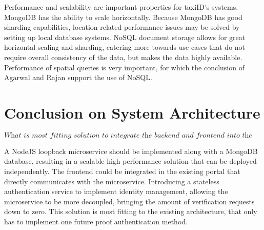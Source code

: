 Performance and scalability are important properties for taxiID's systems. MongoDB has the ability to scale horizontally. Because MongoDB has good sharding capabilities, location related performance issues may be solved by setting up local database systems. NoSQL document storage allows for great horizontal scaling and sharding, catering more towards use cases that do not require overall consistency of the data, but makes the data highly available. Performance of spatial queries is very important, for which the conclusion of Agarwal and Rajan support the use of NoSQL.

%
\section{Conclusion on System Architecture}
\[\textit{What is most fitting solution to integrate the backend and frontend into the existing architecture?}\] \hfill

A NodeJS loopback microservice should be implemented along with a MongoDB database, resulting in a scalable high performance solution that can be deployed independently. The frontend could be integrated in the existing portal that directly communicates with the microservice. Introducing a stateless authentication service to implement identity management, allowing the microservice to be more decoupled, bringing the amount of verification requests down to zero. This solution is most fitting to the existing architecture, that only has to implement one future proof authentication method.
